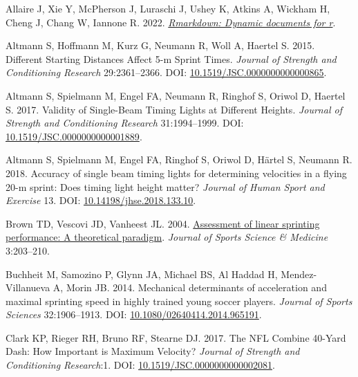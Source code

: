 \documentclass[fleqn,10pt,lineno]{wlpeerj} %
\newlength{\cslhangindent}
\newlength{\cslentryspacingunit} %
\newenvironment{CSLReferences}[2] %
 {%
  \setlength{\parindent}{0pt}
  \ifodd #1
  \let\oldpar\par
  \def\par{\hangindent=\cslhangindent\oldpar}
  \fi
  \setlength{\parskip}{#2\cslentryspacingunit}
 }%
 {}
\begin{document}
\hypertarget{refs}{}
\begin{CSLReferences}{1}{0}
\leavevmode{}%
Allaire J, Xie Y, McPherson J, Luraschi J, Ushey K, Atkins A, Wickham H, Cheng J, Chang W, Iannone R. 2022. \emph{\href{https://CRAN.R-project.org/package=rmarkdown}{Rmarkdown: Dynamic documents for r}}.

\leavevmode{}%
Altmann S, Hoffmann M, Kurz G, Neumann R, Woll A, Haertel S. 2015. Different {Starting Distances Affect} 5-m {Sprint Times}. \emph{Journal of Strength and Conditioning Research} 29:2361--2366. DOI: \href{https://doi.org/10.1519/JSC.0000000000000865}{10.1519/JSC.0000000000000865}.

\leavevmode{}%
Altmann S, Spielmann M, Engel FA, Neumann R, Ringhof S, Oriwol D, Haertel S. 2017. Validity of {Single}-{Beam Timing Lights} at {Different Heights}. \emph{Journal of Strength and Conditioning Research} 31:1994--1999. DOI: \href{https://doi.org/10.1519/JSC.0000000000001889}{10.1519/JSC.0000000000001889}.

\leavevmode{}%
Altmann S, Spielmann M, Engel FA, Ringhof S, Oriwol D, Härtel S, Neumann R. 2018. Accuracy of single beam timing lights for determining velocities in a flying 20-m sprint: {Does} timing light height matter? \emph{Journal of Human Sport and Exercise} 13. DOI: \href{https://doi.org/10.14198/jhse.2018.133.10}{10.14198/jhse.2018.133.10}.

\leavevmode{}%
Brown TD, Vescovi JD, Vanheest JL. 2004. \href{https://www.ncbi.nlm.nih.gov/pmc/articles/PMC3938058}{Assessment of linear sprinting performance: A theoretical paradigm}. \emph{Journal of Sports Science \& Medicine} 3:203--210.

\leavevmode{}%
Buchheit M, Samozino P, Glynn JA, Michael BS, Al Haddad H, Mendez-Villanueva A, Morin JB. 2014. Mechanical determinants of acceleration and maximal sprinting speed in highly trained young soccer players. \emph{Journal of Sports Sciences} 32:1906--1913. DOI: \href{https://doi.org/10.1080/02640414.2014.965191}{10.1080/02640414.2014.965191}.

\leavevmode{}%
Clark KP, Rieger RH, Bruno RF, Stearne DJ. 2017. The {NFL Combine} 40-{Yard Dash}: {How Important} is {Maximum Velocity}? \emph{Journal of Strength and Conditioning Research}:1. DOI: \href{https://doi.org/10.1519/JSC.0000000000002081}{10.1519/JSC.0000000000002081}.


\end{CSLReferences}
\end{document}
